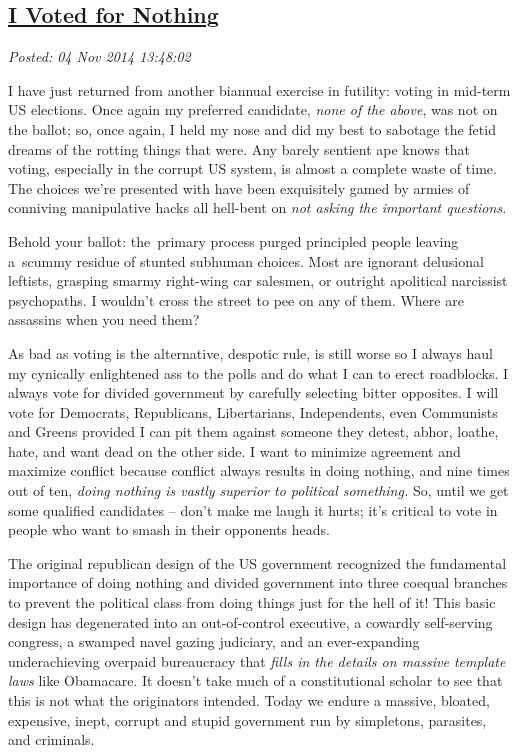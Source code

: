 %

\subsection*{\href{https://bakerjd99.wordpress.com/2014/11/04/i-voted-for-nothing/}{I Voted for Nothing}}


\noindent\emph{Posted: 04 Nov 2014 13:48:02}
\vspace{6pt}

I have just returned from another biannual exercise in futility: voting
in mid-term US elections. Once again my preferred candidate, \emph{none
of the above}, was not on the ballot; so, once again, I held my nose and
did my best to sabotage the fetid dreams of the rotting things that
were. Any barely sentient ape knows that voting, especially in the
corrupt US system, is almost a complete waste of time. The choices we're
presented with have been exquisitely gamed by armies of conniving
manipulative hacks all hell-bent on \emph{not asking the important
questions.}

Behold your ballot: the~primary process purged principled people leaving
a~scummy residue of stunted subhuman choices. Most are ignorant
delusional leftists, grasping smarmy right-wing car salesmen, or
outright apolitical narcissist psychopaths. I wouldn't cross the street
to pee on any of them. Where are assassins when you need them?

As bad as voting is the alternative, despotic rule, is still worse so I
always haul my cynically enlightened ass to the polls and do what I can
to erect roadblocks. I always vote for divided government by carefully
selecting bitter opposites. I will vote for Democrats, Republicans,
Libertarians, Independents, even Communists and Greens provided I can
pit them against someone they detest, abhor, loathe, hate, and want dead
on the other side. I want to minimize agreement and maximize conflict
because conflict always results in doing nothing, and nine times out of
ten, \emph{doing nothing is vastly superior to political something.} So,
until we get some qualified candidates -- don't make me laugh it hurts;
it's critical to vote in people who want to smash in their opponents
heads.

The original republican design of the US government recognized the
fundamental importance of doing nothing and divided government into
three coequal branches to prevent the political class from doing things
just for the hell of it! This basic design has degenerated into an
out-of-control executive, a cowardly self-serving congress, a swamped
navel gazing judiciary, and an ever-expanding underachieving overpaid
bureaucracy that \emph{fills in the details on massive template laws}
like Obamacare. It doesn't take much of a constitutional scholar to see
that this is not what the originators intended. Today we endure a
massive, bloated, expensive, inept, corrupt and stupid government run by
simpletons, parasites, and criminals.

